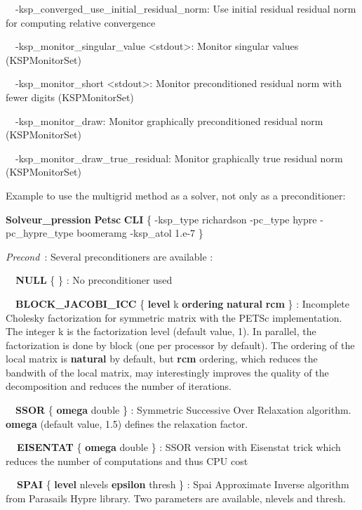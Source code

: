 \ \ {}-ksp\_converged\_use\_initial\_residual\_norm: Use initial residual residual norm for computing relative
convergence

\ \ {}-ksp\_monitor\_singular\_value {\textless}stdout{\textgreater}: Monitor singular values (KSPMonitorSet)

\ \ {}-ksp\_monitor\_short {\textless}stdout{\textgreater}: Monitor preconditioned residual norm with fewer digits
(KSPMonitorSet)

\ \ {}-ksp\_monitor\_draw: Monitor graphically preconditioned residual norm (KSPMonitorSet)

\ \ {}-ksp\_monitor\_draw\_true\_residual: Monitor graphically true residual norm (KSPMonitorSet)


\bigskip

Example to use the multigrid method as a solver, not only as a preconditioner:

\textbf{Solveur}\textbf{\_pression} \textbf{Petsc} \textbf{CLI} \{
-ksp\_type richardson -pc\_type hypre -pc\_hypre\_type boomeramg -ksp\_atol 1.e-7 \}


\bigskip


\bigskip

\textit{Precond}\textit{~}: Several preconditioners are available :

\textit{\ \ }\textbf{NULL} \{ \} : No preconditioner used

\ \ \textbf{BLOCK\_JACOBI\_ICC }\{\textbf{ level }k \textbf{ordering} \textbf{natural} {\textbar} \textbf{rcm} \} :
Incomplete Cholesky factorization for symmetric matrix with the PETSc implementation. The integer k is
the factorization level (default value, 1). In parallel, the factorization is done by block (one per processor by
default). The ordering of the local matrix is \textbf{natural} by default, but \textbf{rcm} ordering,
which reduces the bandwith of the local matrix, may interestingly improves the quality of the decomposition and reduces
the number of iterations.

\ \ \textbf{SSOR} \{ \textbf{omega} double \} : Symmetric Successive Over Relaxation algorithm.
\textbf{omega} (default value, 1.5) defines the relaxation factor. 

\textbf{\ \ EISENTAT }\{ \textbf{omega }double \} : SSOR version with Eisenstat trick which reduces the
number of computations and thus CPU cost

\textbf{\ \ SPAI }\{\textbf{ level }nlevels \textbf{epsilon} thresh \} : Spai Approximate Inverse algorithm
from Parasails Hypre library. Two parameters are available, nlevels and thresh.

